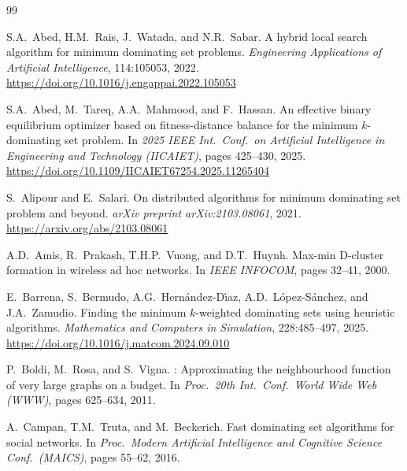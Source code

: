 \documentclass[11pt,a4paper]{article}
\begin{document}


\begin{thebibliography}{99}

S.A.~Abed, H.M.~Rais, J.~Watada, and N.R.~Sabar.
\newblock A hybrid local search algorithm for minimum dominating set
  problems.
\newblock \emph{Engineering Applications of Artificial Intelligence},
  114:105053, 2022.
\newblock \url{https://doi.org/10.1016/j.engappai.2022.105053}

S.A.~Abed, M.~Tareq, A.A.~Mahmood, and F.~Hassan.
\newblock An effective binary equilibrium optimizer based on
  fitness-distance balance for the minimum $k$-dominating set
  problem.
\newblock In \emph{2025 IEEE Int.\ Conf.\ on Artificial Intelligence
  in Engineering and Technology (IICAIET)}, pages 425--430, 2025.
\newblock \url{https://doi.org/10.1109/IICAIET67254.2025.11265404}

S.~Alipour and E.~Salari.
\newblock On distributed algorithms for minimum dominating set
  problem and beyond.
\newblock \emph{arXiv preprint arXiv:2103.08061}, 2021.
\newblock \url{https://arxiv.org/abs/2103.08061}

A.D.~Amis, R.~Prakash, T.H.P.~Vuong, and D.T.~Huynh.
\newblock Max-min {D}-cluster formation in wireless ad hoc networks.
\newblock In \emph{IEEE INFOCOM}, pages 32--41, 2000.

E.~Barrena, S.~Bermudo, A.G.~Hern{\'a}ndez-D{\'\i}az,
  A.D.~L{\'o}pez-S{\'a}nchez, and J.A.~Zamudio.
\newblock Finding the minimum $k$-weighted dominating sets using
  heuristic algorithms.
\newblock \emph{Mathematics and Computers in Simulation},
  228:485--497, 2025.
\newblock \url{https://doi.org/10.1016/j.matcom.2024.09.010}

P.~Boldi, M.~Rosa, and S.~Vigna.
: Approximating the neighbourhood function of very
  large graphs on a budget.
\newblock In \emph{Proc.\ 20th Int.\ Conf.\ World Wide Web (WWW)},
  pages 625--634, 2011.

A.~Campan, T.M.~Truta, and M.~Beckerich.
\newblock Fast dominating set algorithms for social networks.
\newblock In \emph{Proc.\ Modern Artificial Intelligence and
  Cognitive Science Conf.\ (MAICS)}, pages 55--62, 2016.


\end{thebibliography}
\end{document}
